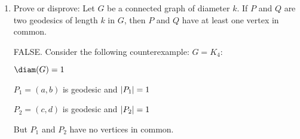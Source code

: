 \documentclass[letterpaper,12pt,fleqn]{article}
\begin{document}
\begin{enumerate}[start=11]
\begin{enumerate}
    \begin{proof}
      ABC: \(P\) and \(Q\) have no vertices in common.

      Let \(P=(u_0,u_1,\ldots,u_k)\) and \(Q=(v_0,v_1,\ldots,v_k)\).  Since \(G\) is connected, every \(u_i\) in \(P\)
      is connected to every \(v_j\) in \(Q\).  Let \(R=(u_i=w_1,w_2,\ldots,w_{\ell}=v_j)\) be the shortest such path
      and AWLOG that \(i\ge j\).  Note that no other vertices in \(P\) or \(Q\) can exist in \(R\), otherwise the
      minimality of \(\abs{R}\) is contradicted.  Now, consider the path \(S=(u_0,\ldots,u_i,\ldots v_j,\ldots v_k)\):
      \begin{align*}
        \abs{S} &= i+\ell+(k-j) \\
        &= k +\ell+(i-j) \\
        &> k
      \end{align*}
      since \(\ell>0\) and \(i-j\ge0\), thus contradicting the maximality of \(\abs{P}\) and \(\abs{Q}\).

      \(\therefore, P\) and \(Q\) share at least one vertex in common.
    \end{proof}

  \item Prove or disprove: Let \(G\) be a connected graph of diameter \(k\).  If \(P\) and \(Q\) are two geodesics
    of length \(k\) in \(G\), then \(P\) and \(Q\) have at least one vertex in common.

    FALSE.  Consider the following counterexample: \(G=K_4\):

    \bigskip

    \begin{minipage}{2.5in}
      \begin{center}
      \end{center}
    \end{minipage}
    \begin{minipage}{3in}
      \(\diam(G)=1\)

      \bigskip

      \(P_1=(a,b)\) is geodesic and \(\lvert P_1\rvert=1\)

      \(P_2=(c,d)\) is geodesic and \(\lvert P_2\rvert=1\)

      \bigskip

      But \(P_1\) and \(P_2\) have no vertices in common.
    \end{minipage}
  \end{enumerate}


\end{enumerate}
\end{document}
